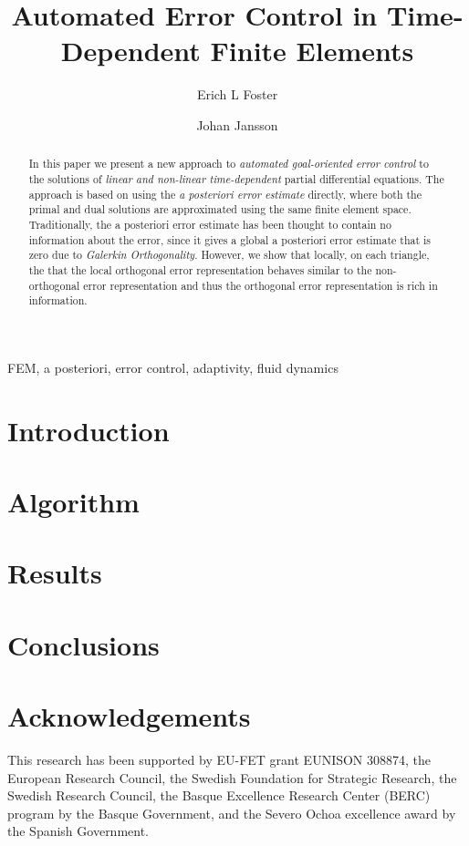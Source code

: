 \documentclass[a4paper]{article}
\author[1]{Erich L Foster}
\author[1,2]{Johan Jansson}
\affil[1]{Basque Center for Applied Mathematics, Bilbao, Basque Country -- Spain}
\affil[2]{CSC, KTH Royal Institute of Technology, Stockholm, Sweden}
\title{Automated Error Control in Time-Dependent Finite Elements}
\begin{document}
  \maketitle
  \tableofcontents
  \begin{abstract}
    In this paper we present a new approach to \emph{automated goal-oriented
    error control} to the solutions of \emph{linear and non-linear
    time-dependent} partial differential equations. The approach is based
    on using the \emph{a posteriori error estimate} directly, where both the
    primal and dual solutions are approximated using the same finite element
    space.  Traditionally, the a posteriori error estimate has been thought to
    contain no information about the error, since it gives a global a
    posteriori error estimate that is zero due to \emph{Galerkin
    Orthogonality}. However, we show that locally, on each triangle, the that
    the local orthogonal error representation behaves similar to the
    non-orthogonal error representation and thus the orthogonal error
    representation is rich in information.
  \end{abstract}
  \begin{keywords}
    FEM, a posteriori, error control, adaptivity, fluid dynamics
  \end{keywords}

  \section{Introduction} \label{sec:Intro}
  

  \section{Algorithm} \label{sec:Algorithm}
  

  \section{Results} \label{sec:Results}
  

  \section{Conclusions} \label{sec:Conclusions}
  

  \section*{Acknowledgements}
  This research has been supported by EU-FET grant EUNISON 308874, the European
  Research Council, the Swedish Foundation for Strategic Research, the Swedish
  Research Council, the Basque Excellence Research Center (BERC) program by
  the Basque Government, and the Severo Ochoa excellence award by the Spanish
  Government.

  \printbibliography
\end{document}
